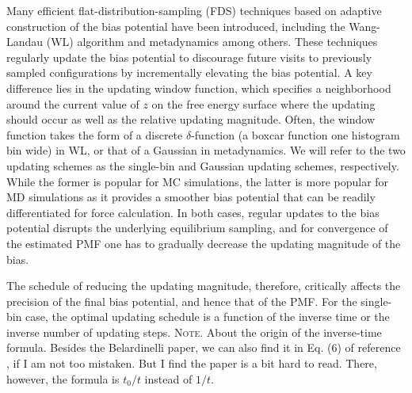\documentclass[preprint, superscriptaddress, floatfix]{revtex4-1}
\newcommand{\note}[1]{{\color{DarkGreen}\footnotesize \textsc{Note.} #1}}
\begin{document}
Many efficient flat-distribution-sampling (FDS) techniques
based on adaptive construction of the bias potential
have been introduced,
including the Wang-Landau (WL) algorithm\cite{
  wang2001, wang2001pre}
and metadynamics\cite{huber1994,
  *laio2002, *laio2008, *barducci2011, *sutto2012, micheletti2004}
among others\cite{kim2006, *kim2007, kim2010, junghans2014,
  langfeld2012, pellegrini2014,
  maragliano2006, *abrams2008,
  zheng2010}.
%
These techniques regularly update the bias potential
to discourage future visits to previously sampled configurations
by incrementally elevating the bias potential.
%
A key difference lies
in the updating window function,
which specifies
a neighborhood around the current value of
$z$ on the free energy surface
where the updating should occur
as well as the relative updating magnitude.
%
Often, the window function
takes the form of a discrete
$\delta$-function (a boxcar function one histogram bin wide)
in WL,
or that of a Gaussian
in metadynamics.\cite{junghans2014}
%
We will refer to the two updating schemes
as the single-bin
and Gaussian updating schemes, respectively.
%
While the former is popular for MC simulations\cite{wang2001,
  wang2001pre, kim2006, *kim2007},
the latter is more popular for MD simulations
as it provides a smoother bias potential
that can be readily differentiated for force calculation.\cite{huber1994,
  *laio2002, *laio2008, *barducci2011, *sutto2012, junghans2014}
%
In both cases,
regular updates to the bias potential
disrupts the underlying equilibrium
sampling\cite{zhou2005, morozov2007, zhou2008},
and for convergence of the estimated PMF
one has to gradually decrease
the updating magnitude of the bias.



The schedule of reducing
the updating magnitude,
therefore, critically affects
the precision of the final bias potential,
and hence that of the PMF\cite{laio2005, bussi2006, poulain2006,
belardinelli2007, *belardinelli2007jcp, *belardinelli2008, *belardinelli2016,
liang2007, min2007,
morozov2007, zhou2008,
komura2012, *caparica2012, *caparica2014,
barducci2008, dickson2011, dama2014}.
%
For the single-bin case, the optimal updating schedule
is a function of the
inverse time\cite{
belardinelli2007, *belardinelli2007jcp, *belardinelli2008, *belardinelli2016,
liang2007,
morozov2007, zhou2008}
or
the inverse number of updating steps.
\note{
  About the origin of the inverse-time formula.
  Besides the Belardinelli paper,
  we can also find it in Eq. (6) of reference \cite{liang2007},
  if I am not too mistaken.
  But I find the paper is a bit hard to read.
  There, however, the formula is $t_0/t$ instead of $1/t$.
}
\end{document}
